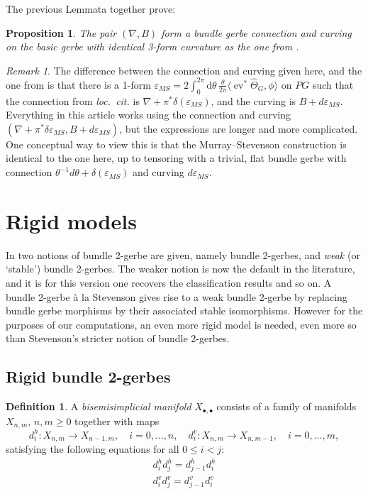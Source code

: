\documentclass[12pt]{amsart}
\DeclareMathOperator{\ev}{ev}
\theoremstyle{plain}
\newtheorem{proposition}[theorem]{Proposition}
\theoremstyle{definition}
\newtheorem{definition}[theorem]{Definition}
\theoremstyle{remark}
\newtheorem{remark}[theorem]{Remark}
\numberwithin{equation}{section}
\newcommand{\<}{\langle}
\renewcommand{\>}{\rangle}
\newcommand{\intSone}{\int_{0}^{2\pi}\mathrm{d}\theta\,}
\newcommand{\Thetahat}{\widehat{\Theta}}
\begin{document}
The previous Lemmata together prove:
\begin{proposition}
The pair $(\nabla,B)$ form a bundle gerbe connection and curving on the basic gerbe with identical 3-form curvature as the one from \cite{MS03}.
\end{proposition}

\begin{remark}\label{rem:MS_epsilon_correction}
The difference between the connection and curving given here, and the one from \cite{MS03} is that there is a 1-form $\varepsilon_{MS}=2\intSone \tfrac{\theta}{2\pi} \langle\ev^*\Thetahat_G,\phi\rangle$ on $PG$ such that the connection from \emph{loc.\ cit.} is $\nabla+\pi^*\delta(\varepsilon_{MS})$, and the curving is $B+d\varepsilon_{MS}$. Everything in this article works using the connection and curving $(\nabla+\pi^*\delta\varepsilon_{MS},B+d\varepsilon_{MS})$, but the expressions are longer and more complicated.
One conceptual way to view this is that the Murray--Stevenson construction is identical to the one here, up to tensoring with a trivial, flat bundle gerbe with connection $\theta^{-1}d\theta + \delta(\varepsilon_{MS})$ and curving $d\varepsilon_{MS}$.
\end{remark}









\section{Rigid models}

In \cite{Ste} two notions of bundle 2-gerbe are given, namely bundle 2-gerbes, and \emph{weak} (or `stable') bundle 2-gerbes. 
The weaker notion is now the default in the literature, and it is for this version one recovers the classification results and so on. A bundle 2-gerbe  \`a la Stevenson gives rise to a weak bundle 2-gerbe by replacing bundle gerbe morphisms by their associated stable isomorphisms.
However for the purposes of our computations, an even more rigid model is needed, even more so than Stevenson's stricter notion of bundle 2-gerbes.

\subsection{Rigid bundle 2-gerbes}

\begin{definition}
A \emph{bisemisimplicial manifold} $X_{\bullet,\bullet}$ consists of a family of manifolds $X_{n,m}$, $n,m\geq 0$ together with maps
\[
  d_i^h\colon X_{n,m}\to X_{n-1,m},\quad i=0,\ldots,n,\quad d_i^v\colon X_{n,m}\to X_{n,m-1},\quad i=0,\ldots,m,
\]
satisfying the following equations for all $0\leq i< j$:
\begin{align*}
d_i^h d_j^h = d_{j-1}^h d_i^h\\
d_i^v d_j^v = d_{j-1}^v d_i^v
\end{align*}

\end{definition}
\end{document}
